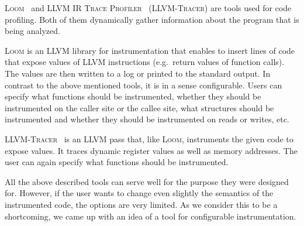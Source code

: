 \textsc{Loom}~\cite{loom}  and \textsc{LLVM IR Trace Profiler}~\cite{tracer}
(\textsc{LLVM-Tracer}) are tools used for code profiling. Both of them
dynamically gather information about the program that is being analyzed.

\textsc{Loom} is an LLVM library for instrumentation that enables to insert
lines of code that expose values of LLVM instructions (e.g.~return values of
function calls). The values are then written to a log or printed to the
standard output. In contrast to the above mentioned tools, it is in a sense
configurable. Users can specify what functions should be instrumented, whether
they should be instrumented on the caller site or the callee site, what
structures should be instrumented and whether they should be instrumented on
reads or writes, etc.

\textsc{LLVM-Tracer}~\cite{tracer} is an LLVM pass that, like \textsc{Loom},
instruments the given code to expose values. It traces dynamic register values
as well as memory addresses. The user can again specify what functions should
be instrumented.

All the above described tools can serve well for the purpose they were designed
for. However, if the user wants to change even slightly the semantics of the
instrumented code, the options are very limited. As we consider this to be
a shortcoming, we came up with an idea of a tool for configurable
instrumentation.
